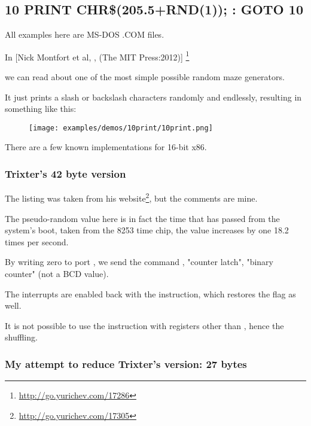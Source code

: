 \subsection{10 PRINT CHR\$(205.5+RND(1)); : GOTO 10}

All examples here are MS-DOS .COM files.

In [Nick Montfort et al, , (The MIT Press:2012)]
\footnote{\AlsoAvailableAs \url{http://go.yurichev.com/17286}}

we can read about one of the most simple possible random maze generators.

It just prints a slash or backslash characters randomly and endlessly, resulting in something like this:

\begin{figure}[H]
\centering
\texttt{[image: examples/demos/10print/10print.png]}
\end{figure}

There are a few known implementations for 16-bit x86.

\subsubsection{Trixter's 42 byte version}

\newcommand{\FNURLTRIXTER}{\footnote{\url{http://go.yurichev.com/17305}}}

The listing was taken from his website\FNURLTRIXTER, 
but the comments are mine.



The pseudo-random value here is in fact the time 
that has passed from the system's boot, taken from the 8253 time chip, the value increases by one 18.2 times per second.

By writing zero to port , 
we send the command , 
"counter latch", 
"binary counter" (not a \ac{BCD} value).

The interrupts are enabled back with the  instruction, which restores the  flag as well.

It is not possible to 
use the  instruction with registers other than , 
hence the shuffling.

\subsubsection{
My attempt to reduce Trixter's version: 27 bytes}

